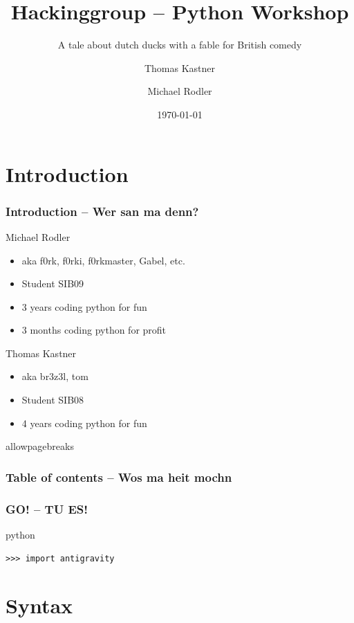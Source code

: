 \documentclass{beamer}
\title[Python Workshop]{Hackinggroup -- Python Workshop}
\subtitle{A tale about dutch ducks with a fable for British comedy}
\author[Thomas Kastner, Michael Rodler]{Thomas Kastner\and Michael Rodler}
\date{\today}
\begin{document}
\begin{frame}
    \titlepage
\end{frame}

\section*{Introduction}

\begin{frame}
    \frametitle{Introduction -- Wer san ma denn?}

    \begin{block}{Michael Rodler}
    \begin{itemize}
        \item aka f0rk, f0rki, f0rkmaster, Gabel, etc.
        \item Student SIB09
        \item 3 years coding python for fun
        \item 3 months coding python for profit
    \end{itemize}
    \end{block}

    \begin{block}{Thomas Kastner}
    \begin{itemize}
        \item aka br3z3l, tom
        \item Student SIB08
        \item 4 years coding python for fun
    \end{itemize}
    \end{block}
\end{frame}


\begin{frame}{allowpagebreaks}
    \frametitle{Table of contents -- Wos ma heit mochn}
    \tableofcontents
\end{frame}

\begin{frame}[fragile]
	\frametitle{GO! -- TU ES!}
	\pause
    \begin{exampleblock}{python}
    \begin{lstlisting}
>>> import antigravity
    \end{lstlisting}
    \end{exampleblock}
\end{frame}


\section{Syntax}
\end{document}
